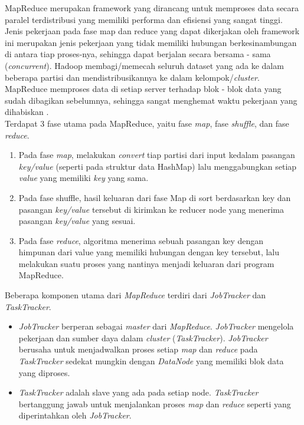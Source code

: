 		MapReduce merupakan framework yang dirancang untuk memproses data secara paralel terdistribusi yang memiliki performa dan efisiensi yang sangat tinggi. Jenis pekerjaan pada fase map dan reduce yang dapat dikerjakan oleh framework ini merupakan jenis pekerjaan yang tidak memiliki hubungan berkesinambungan di antara  tiap proses-nya, sehingga dapat berjalan secara bersama - sama (\textit{concurrent}). Hadoop membagi/memecah seluruh dataset yang ada ke dalam beberapa partisi dan mendistribusikannya ke dalam kelompok/\textit{cluster}. MapReduce memproses data di setiap server terhadap blok - blok data yang sudah dibagikan sebelumnya, sehingga sangat menghemat waktu pekerjaan yang dihabiskan \cite{Lam:1965594:HA}. \\
		Terdapat 3 fase utama pada MapReduce, yaitu fase \textit{map}, fase \textit{shuffle}, dan fase \textit{reduce}. 
		\begin{enumerate}
			\item Pada fase \textit{map}, melakukan \textit{convert} tiap partisi dari input kedalam pasangan \textit{key/value} (seperti pada struktur data HashMap) lalu menggabungkan setiap \textit{value} yang memiliki \textit{key} yang sama.
			\item Pada fase shuffle, hasil keluaran dari fase Map di sort berdasarkan key dan pasangan \textit{key/value} tersebut di kirimkan ke reducer node yang menerima pasangan \textit{key/value} yang sesuai.
			\item Pada fase \textit{reduce}, algoritma menerima sebuah pasangan key dengan himpunan dari value yang memiliki hubungan dengan key tersebut, lalu melakukan suatu proses yang nantinya menjadi keluaran dari program MapReduce.
		\end{enumerate} 
		
	Beberapa komponen utama dari \textit{MapReduce} terdiri dari \textit{JobTracker} dan \textit{TaskTracker}.
	\begin{itemize}
		\item \textit{JobTracker} berperan sebagai \textit{master} dari \textit{MapReduce}. \textit{JobTracker} mengelola pekerjaan dan sumber daya dalam \textit{cluster} (\textit{TaskTracker}). \textit{JobTracker} berusaha untuk menjadwalkan proses setiap \textit{map} dan \textit{reduce} pada \textit{TaskTracker} sedekat mungkin dengan \textit{DataNode} yang memiliki blok data yang diproses.
		\item \textit{TaskTracker} adalah slave yang ada pada setiap node. \textit{TaskTracker} bertanggung jawab untuk menjalankan proses \textit{map} dan \textit{reduce} seperti yang diperintahkan oleh \textit{JobTracker}.
	\end{itemize}
		
